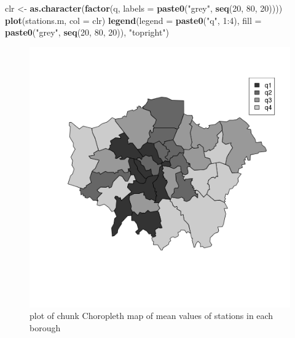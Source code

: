 \documentclass[]{article}
\newenvironment{Shaded}{}{}
\newcommand{\KeywordTok}[1]{\textcolor[rgb]{0.00,0.44,0.13}{\textbf{{#1}}}}
\newcommand{\DataTypeTok}[1]{\textcolor[rgb]{0.56,0.13,0.00}{{#1}}}
\newcommand{\DecValTok}[1]{\textcolor[rgb]{0.25,0.63,0.44}{{#1}}}
\newcommand{\StringTok}[1]{\textcolor[rgb]{0.25,0.44,0.63}{{#1}}}
\newcommand{\NormalTok}[1]{{#1}}
\begin{document}
\begin{Shaded}
\begin{Highlighting}[]
\NormalTok{clr <-}\StringTok{ }\KeywordTok{as.character}\NormalTok{(}\KeywordTok{factor}\NormalTok{(q, }\DataTypeTok{labels =} \KeywordTok{paste0}\NormalTok{(}\StringTok{"grey"}\NormalTok{, }\KeywordTok{seq}\NormalTok{(}\DecValTok{20}\NormalTok{, }\DecValTok{80}\NormalTok{, }\DecValTok{20}\NormalTok{))))}
\KeywordTok{plot}\NormalTok{(stations.m, }\DataTypeTok{col =} \NormalTok{clr)}
\KeywordTok{legend}\NormalTok{(}\DataTypeTok{legend =} \KeywordTok{paste0}\NormalTok{(}\StringTok{"q"}\NormalTok{, }\DecValTok{1}\NormalTok{:}\DecValTok{4}\NormalTok{), }\DataTypeTok{fill =} \KeywordTok{paste0}\NormalTok{(}\StringTok{"grey"}\NormalTok{, }\KeywordTok{seq}\NormalTok{(}\DecValTok{20}\NormalTok{, }\DecValTok{80}\NormalTok{, }\DecValTok{20}\NormalTok{)), }\StringTok{"topright"}\NormalTok{)}
\end{Highlighting}
\end{Shaded}

\begin{figure}[htbp]
\centering
\includegraphics{figure/Choropleth_map_of_mean_values_of_stations_in_each_borough.png}
\caption{plot of chunk Choropleth map of mean values of stations in each
borough}
\end{figure}
\end{document}

